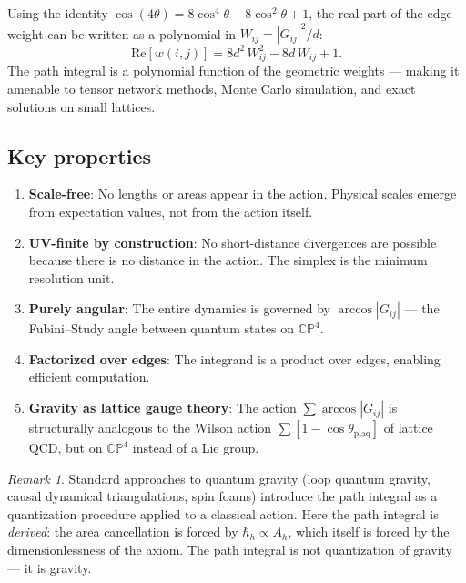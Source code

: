 \documentclass[12pt]{article}
\theoremstyle{remark}
\newtheorem{remark}[theorem]{Remark}
\theoremstyle{definition}
\begin{document}
Using the identity $\cos(4\theta) = 8\cos^4\theta - 8\cos^2\theta + 1$, the real part of the edge weight can be written as a polynomial in $W_{ij} = |G_{ij}|^2/d$:
\begin{equation}
\text{Re}[w(i,j)] = 8d^2\,W_{ij}^2 - 8d\,W_{ij} + 1.
\end{equation}
The path integral is a polynomial function of the geometric weights --- making it amenable to tensor network methods, Monte Carlo simulation, and exact solutions on small lattices.

\subsection{Key properties}

\begin{enumerate}
\item \textbf{Scale-free}: No lengths or areas appear in the action. Physical scales emerge from expectation values, not from the action itself.

\item \textbf{UV-finite by construction}: No short-distance divergences are possible because there is no distance in the action. The simplex is the minimum resolution unit.

\item \textbf{Purely angular}: The entire dynamics is governed by $\arccos|G_{ij}|$ --- the Fubini--Study angle between quantum states on $\mathbb{CP}^4$.

\item \textbf{Factorized over edges}: The integrand is a product over edges, enabling efficient computation.

\item \textbf{Gravity as lattice gauge theory}: The action $\sum\arccos|G_{ij}|$ is structurally analogous to the Wilson action $\sum[1 - \cos\theta_\text{plaq}]$ of lattice QCD, but on $\mathbb{CP}^4$ instead of a Lie group.
\end{enumerate}

\begin{remark}
Standard approaches to quantum gravity (loop quantum gravity, causal dynamical triangulations, spin foams) introduce the path integral as a quantization procedure applied to a classical action. Here the path integral is \emph{derived}: the area cancellation is forced by $\hbar_h \propto A_h$, which itself is forced by the dimensionlessness of the axiom. The path integral is not quantization of gravity --- it is gravity.
\end{remark}
\end{document}
